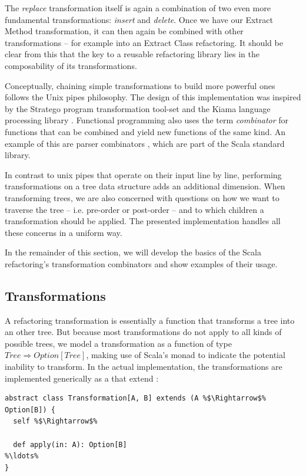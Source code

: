 The \textit{replace} transformation itself is again a combination of two even more fundamental transformations: \textit{insert} and \textit{delete}. Once we have our Extract Method transformation, it can then again be combined with other transformations -- for example into an Extract Class refactoring. It should be clear from this that the key to a reusable refactoring library lies in the composability of its transformations. 

Conceptually, chaining simple transformations to build more powerful ones follows the Unix pipes philosophy. The design of this implementation was inspired by the Stratego program transformation tool-set \cite{Stratego} and the Kiama language processing library \cite{Kiama}. Functional programming also uses the term \textit{combinator} for functions that can be combined and yield new functions of the same kind. An example of this are parser combinators \cite{ParserCombinators}, which are part of the Scala standard library.

In contrast to unix pipes that operate on their input line by line, performing transformations on a tree data structure adds an additional dimension. When transforming trees, we are also concerned with questions on how we want to traverse the tree -- i.e. pre-order or post-order -- and to which children a transformation should be applied. The presented implementation handles all these concerns in a uniform way.

In the remainder of this section, we will develop the basics of the Scala refactoring's transformation combinators and show examples of their usage.

\subsection{Transformations}

A refactoring transformation is essentially a function that transforms a tree into an other tree. But because most transformations do not apply to all kinds of possible trees, we model a transformation as a function of type $Tree\Rightarrow Option[Tree]$, making use of Scala's  monad to indicate the potential inability to transform. In the actual implementation, the transformations are implemented generically as a  that extend :

\begin{lstlisting}
abstract class Transformation[A, B] extends (A %$\Rightarrow$% Option[B]) {
  self %$\Rightarrow$%

  def apply(in: A): Option[B]
%\ldots%
}
\end{lstlisting}


